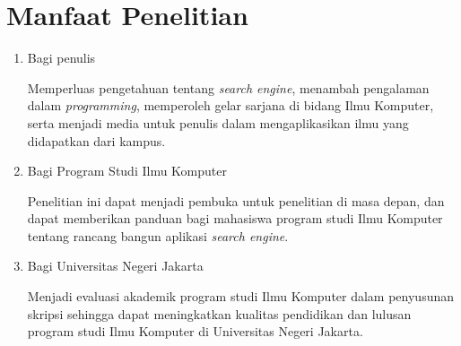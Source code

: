 \section{Manfaat Penelitian}
\begin{enumerate}
	\item Bagi penulis
		
	Memperluas pengetahuan tentang \textit{search engine}, menambah pengalaman dalam \textit{programming}, memperoleh gelar sarjana di bidang Ilmu Komputer, serta menjadi media untuk penulis dalam mengaplikasikan ilmu yang didapatkan dari kampus.
		
	\item Bagi Program Studi Ilmu Komputer
	 	
	Penelitian ini dapat menjadi pembuka untuk penelitian di masa depan, dan dapat memberikan panduan bagi mahasiswa program studi Ilmu Komputer tentang rancang bangun aplikasi \textit{search engine}.
	
	\item Bagi Universitas Negeri Jakarta
	 	
	Menjadi evaluasi akademik program studi Ilmu Komputer dalam penyusunan skripsi sehingga dapat meningkatkan kualitas pendidikan dan lulusan program studi Ilmu Komputer di Universitas Negeri Jakarta.
	 			
\end{enumerate}

